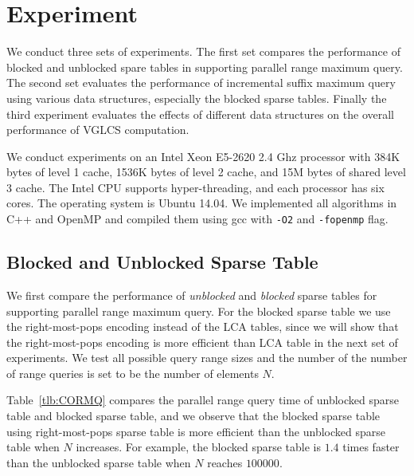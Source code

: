 \section{Experiment} \label{sec:Experiment}

We conduct three sets of experiments.  The first set compares the
performance of blocked and unblocked spare tables in supporting
parallel range maximum query.  The second set evaluates the
performance of incremental suffix maximum query using various data
structures, especially the blocked sparse tables.  Finally the third
experiment evaluates the effects of different data structures on the
overall performance of VGLCS computation.

We conduct experiments on an Intel Xeon E5-2620 2.4 Ghz processor with
384K bytes of level 1 cache, 1536K bytes of level 2 cache, and 15M
bytes of shared level 3 cache.  The Intel CPU supports
hyper-threading, and each processor has six cores.  The operating
system is Ubuntu 14.04.  We implemented all algorithms in C++ and
OpenMP and compiled them using gcc with {\tt -O2} and {\tt -fopenmp}
flag.

\subsection{Blocked and Unblocked Sparse Table}

We first compare the performance of {\em unblocked} and {\em blocked}
sparse tables for supporting parallel range maximum query.  For the
blocked sparse table we use the right-most-pops encoding instead of
the LCA tables, since we will show that the right-most-pops encoding
is more efficient than LCA table in the next set of experiments.  We
test all possible query range sizes and the number of the number of
range queries is set to be the number of elements $N$.

Table~\ref{tlb:CORMQ} compares the parallel range query time of
unblocked sparse table and blocked sparse table, and we observe that
the blocked sparse table using right-most-pops sparse table is more
efficient than the unblocked sparse table when $N$ increases.  For
example, the blocked sparse table is $1.4$ times faster than the
unblocked sparse table when $N$ reaches $100000$. 

